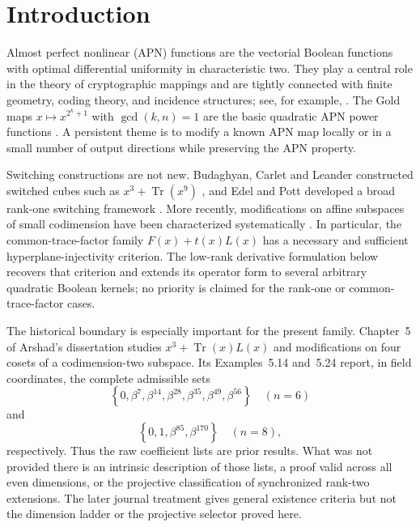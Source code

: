 \documentclass[pdflatex,sn-mathphys-num]{sn-jnl}
\theoremstyle{thmstyleone}
\theoremstyle{thmstyletwo}
\theoremstyle{thmstylethree}
\newcommand{\Tr}{\operatorname{Tr}}
\newcommand{\set}[1]{\left\{#1\right\}}
\begin{document}
\section{Introduction}\label{sec:intro}

Almost perfect nonlinear (APN) functions are the vectorial Boolean functions with optimal differential uniformity in characteristic two.  They play a central role in the theory of cryptographic mappings and are tightly connected with finite geometry, coding theory, and incidence structures; see, for example, \cite{Carlet2021}.  The Gold maps $x\mapsto x^{2^k+1}$ with $\gcd(k,n)=1$ are the basic quadratic APN power functions \cite{Gold1968}.  A persistent theme is to modify a known APN map locally or in a small number of output directions while preserving the APN property.

Switching constructions are not new.  Budaghyan, Carlet and Leander constructed switched cubes such as $x^3+\Tr(x^9)$ \cite{BudaghyanCarletLeander2009}, and Edel and Pott developed a broad rank-one switching framework \cite{EdelPott2009}.  More recently, modifications on affine subspaces of small codimension have been characterized systematically \cite{TaniguchiEtAl2025}.  In particular, the common-trace-factor family $F(x)+t(x)L(x)$ has a necessary and sufficient hyperplane-injectivity criterion.  The low-rank derivative formulation below recovers that criterion and extends its operator form to several arbitrary quadratic Boolean kernels; no priority is claimed for the rank-one or common-trace-factor cases.

The historical boundary is especially important for the present family.  Chapter~5 of Arshad's dissertation \cite{Arshad2018} studies $x^3+\Tr(x)L(x)$ and modifications on four cosets of a codimension-two subspace.  Its Examples~5.14 and~5.24 report, in field coordinates, the complete admissible sets
\[
 \set{0,\beta^7,\beta^{14},\beta^{28},\beta^{35},\beta^{49},\beta^{56}}
 \quad(n=6)
\]
and
\[
 \set{0,1,\beta^{85},\beta^{170}}
 \quad(n=8),
\]
respectively.  Thus the raw coefficient lists are prior results.  What was not provided there is an intrinsic description of those lists, a proof valid across all even dimensions, or the projective classification of synchronized rank-two extensions.  The later journal treatment \cite{TaniguchiEtAl2025} gives general existence criteria but not the dimension ladder or the projective selector proved here.
\end{document}
